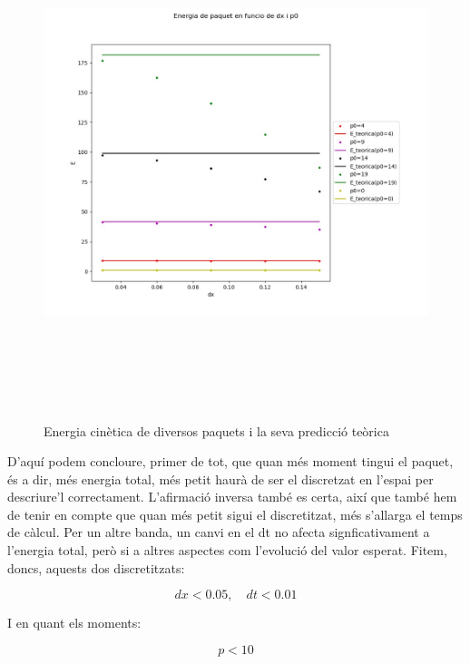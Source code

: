 \documentclass{article}
\begin{document}
\begin{figure}[H]
	\includegraphics[width=\textwidth,height=15cm]{problemaenergia6.jpg}
	\caption{Energia cinètica de diversos paquets i la seva predicció teòrica}
\end{figure}

D'aquí podem concloure, primer de tot, que quan més moment tingui el paquet, és a dir, més energia total, més petit haurà de ser el discretzat en l'espai per descriure'l correctament. L'afirmació inversa també es certa, així que també hem de tenir en compte que quan més petit sigui el discretitzat, més s'allarga el temps de càlcul. Per un altre banda, un canvi en el dt no afecta signficativament a l'energia total, però si a altres aspectes com l'evolució del valor esperat. Fitem, doncs, aquests dos discretitzats:

\begin{equation}
dx<0.05, \quad dt<0.01
\end{equation}

I en quant els moments:

\begin{equation}
p<10
\end{equation}
\end{document}
